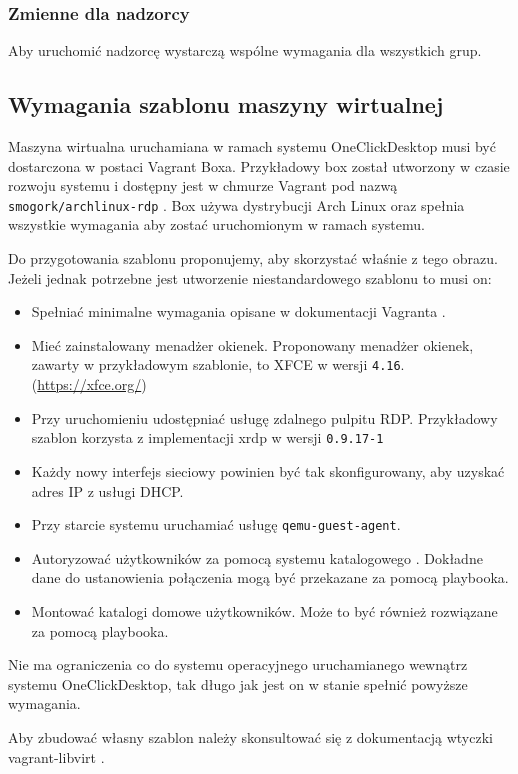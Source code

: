 \documentclass[../opis-rozwiazania.tex]{subfiles}
\begin{document}
\subsubsection{Zmienne dla nadzorcy}
Aby uruchomić nadzorcę wystarczą wspólne wymagania dla wszystkich grup.

\subsection{Wymagania szablonu maszyny wirtualnej}
\label{system_requirements.vagrant_box}
Maszyna wirtualna uruchamiana w ramach systemu OneClickDesktop musi być dostarczona w postaci Vagrant Boxa.
Przykładowy box został utworzony w czasie rozwoju systemu i dostępny jest w chmurze Vagrant pod nazwą \texttt{smogork/archlinux-rdp} \parencite{ocd-vbox}.
Box używa dystrybucji Arch Linux oraz spełnia wszystkie wymagania aby zostać uruchomionym w ramach systemu.

Do przygotowania szablonu proponujemy, aby skorzystać właśnie z tego obrazu.
Jeżeli jednak potrzebne jest utworzenie niestandardowego szablonu to musi on:
\begin{itemize}
  \item Spełniać minimalne wymagania opisane w dokumentacji Vagranta \parencite{vagrant-basebox}.
  \item Mieć zainstalowany menadżer okienek. Proponowany menadżer okienek, zawarty w przykładowym szablonie, to XFCE w wersji \texttt{4.16}. (\url{https://xfce.org/})
  \item Przy uruchomieniu udostępniać usługę zdalnego pulpitu RDP. Przykładowy szablon korzysta z implementacji xrdp w wersji \texttt{0.9.17-1}
  \item Każdy nowy interfejs sieciowy powinien być tak skonfigurowany, aby uzyskać adres IP z usługi DHCP.
  \item Przy starcie systemu uruchamiać usługę \texttt{qemu-guest-agent}.
  \item Autoryzować użytkowników za pomocą systemu katalogowego \parencite{ldap-wiki}. Dokładne dane do ustanowienia połączenia mogą być przekazane za pomocą playbooka.
  \item Montować katalogi domowe użytkowników. Może to być również rozwiązane za pomocą playbooka.
\end{itemize}
Nie ma ograniczenia co do systemu operacyjnego uruchamianego wewnątrz systemu OneClickDesktop, tak długo jak jest on w stanie spełnić powyższe wymagania.

Aby zbudować własny szablon należy skonsultować się z dokumentacją wtyczki vagrant-libvirt \parencite{vlibvirt-box}.
\end{document}
